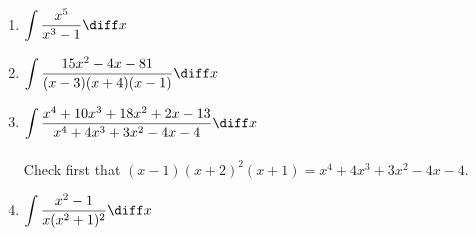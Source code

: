 \begin{multicols}{2}
\begin{enumerate}[ref={\fcProblemRef}]
\item $\displaystyle \int \frac{x^5 }{x^3-1}\diff x$

\item $\displaystyle\int \frac{15x^2-4x-81}{ (x-3)(x +4)(x-1)}\diff x$

\item $\displaystyle \int \frac {x^{4}+10x^{3}+ 18x^{2} +2x - 13}{x^{4} +4x^{3} +3x^{2}- 4x-4} \diff x$ 
\\~\\

Check first that $(x-1)(x+2)^2(x+1)= x^{4}+4x^{3}+3x^{2}-4x-4$. 

\item $\displaystyle \int \frac{x^2-1}{x(x^2+1)^2}\diff x$

\end{enumerate}
\end{multicols}